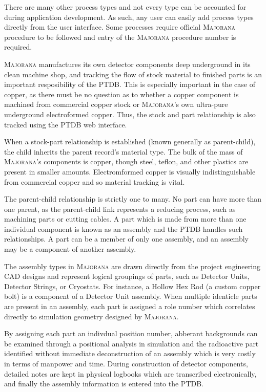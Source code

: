 \documentclass[journal]{IEEEtran}
\begin{document}
There are many other process types and not every type can
be accounted for during application development. As such, any user can 
easily add process types directly from the user interface. Some processes require official \textsc{Majorana} procedure to be
followed and entry of the \textsc{Majorana} procedure number is required.

\textsc{Majorana} manufactures its own detector components deep underground in its clean machine shop, and tracking the 
flow of stock material to finished parts is an important resposibility of the PTDB. This is especially important in the case of
copper, as there must be no question as to whether a copper component is machined from commercial copper stock or
\textsc{Majorana}'s own ultra-pure underground electroformed copper. Thus, the stock and part relationship is also tracked using
the PTDB web interface. 

When a stock-part relationship is established (known generally as parent-child), the child inherits the parent record's
material type. The bulk of the mass of \textsc{Majorana}'s components is copper, though steel, teflon, and other plastics are 
present in smaller amounts. Electromformed copper is visually indistinguishable from commercial copper and so material
tracking is vital.

The parent-child relationship is strictly one to many. No part can have more than one parent, as the parent-child link
represents a reducing process, such as machining parts or cutting cables. A part which is made from more than one individual
component is known as an assembly and the PTDB handles such relationships. A part can be a member of only one assembly,
and an assembly may be a component of another assembly.

The assembly types in \textsc{Majorana} are drawn directly from the project engineering CAD designs and represent logical 
groupings of parts, such as Detector Units, Detector Strings, or Cryostats. For instance, a Hollow Hex Rod 
(a custom copper bolt) is a component of a Detector Unit assembly. When multiple identicle parts are present in an assembly,
each part is assigned a role number which correlates directly to simulation geometry designed by \textsc{Majorana}. 

By assigning each part an indivdual position number, abberant backgrounds can be examined through a positional analysis in 
simulation and the radioactive part identified without immediate deconstruction of an assembly which is very costly in 
terms of manpower and time. During construction of detector components, detailed notes are kept in physical logbooks which
are transcribed electronically, and finally the assembly information is entered into the PTDB.
\end{document}
